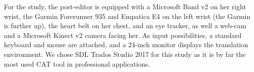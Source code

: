 \documentclass[output=paper]{langsci/langscibook}
\begin{document}


For the study, the post-editor is equipped with a Microsoft Band v2 on her right wrist, the Garmin Forerunner 935 and Empatica E4 on the left wrist (the Garmin is further up), the heart belt on her chest, and an eye tracker, as well a web-cam and a Microsoft Kinect v2 camera facing her. As input possibilities, a standard keyboard and mouse are attached, and a 24-inch monitor displays the translation environment. We chose SDL Trados Studio 2017 for this study as it is by far the most used CAT tool in professional applications.
\end{document}
